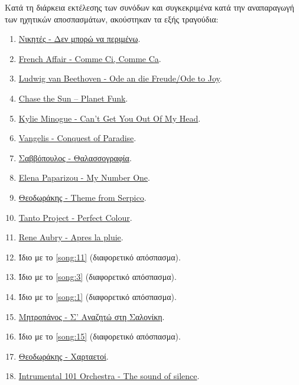 Κατά τη διάρκεια εκτέλεσης των συνόδων και συγκεκριμένα κατά την αναπαραγωγή των ηχητικών αποσπασμάτων, ακούστηκαν τα εξής τραγούδια:
\newcommand{\refSong}[1]{Ίδιο με το \hyperref[song:#1]{\ref{song:#1}}}
\begin{enumerate}
\item \href{https://www.youtube.com/watch?v=vkJ5ff0-tDQ}{Νικητές - Δεν μπορώ να περιμένω}.\label{song:1}
\item \href{https://www.youtube.com/watch?v=xypk6Gk5QzE}{French Affair - Comme Ci, Comme Ca}.\label{song:2}
\item \href{https://www.youtube.com/watch?v=-kcOpyM9cBg}{Ludwig van Beethoven - Ode an die Freude/Ode to Joy}.\label{song:3}
\item \href{https://www.youtube.com/watch?v=T6SvXr9r3OQ}{Chase the Sun – Planet Funk}.\label{song:4}
\item \href{https://www.youtube.com/watch?v=YPwtJ89jes4}{Kylie Minogue - Can't Get You Out Of My Head}.\label{song:5}
\item \href{https://www.youtube.com/watch?v=94dY-QxjDiE}{Vangelis - Conquest of Paradise}.\label{song:6}
\item \href{https://www.youtube.com/watch?v=W74DSSTaIuU}{Σαββόπουλος - Θαλασσογραφία}.\label{song:7}
\item \href{https://www.youtube.com/watch?v=n5Sju9fTLUk}{Elena Paparizou - My Number One}.\label{song:8}
\item \href{https://www.youtube.com/watch?v=r1DMnQHvN7A}{Θεοδωράκης - Theme from Serpico}.\label{song:9}
\item \href{https://www.youtube.com/watch?v=raK2GNAFhJY}{Tanto Project - Perfect Colour}.\label{song:10}
\item \href{https://www.youtube.com/watch?v=R4ywCBarWJc}{Rene Aubry - Apres la pluie}.\label{song:11}
\item \refSong{11} (διαφορετικό απόσπασμα).\label{song:12}
\item \refSong{3} (διαφορετικό απόσπασμα).\label{song:13}
\item \refSong{1} (διαφορετικό απόσπασμα).\label{song:14}
\item \href{https://www.youtube.com/watch?v=OpoLvi_GQYA}{Μητροπάνος - Σ’ Αναζητώ στη Σαλονίκη}.\label{song:15}
\item \refSong{15} (διαφορετικό απόσπασμα).\label{song:16}
\item \href{https://www.youtube.com/watch?v=pSujHbm-rG8}{Θεοδωράκης - Χαρταετοί}.\label{song:17}
\item \href{https://www.youtube.com/watch?v=RWRKkBklg0o}{Intrumental 101 Orchestra - The sound of silence}.\label{song:18}

\end{enumerate}
